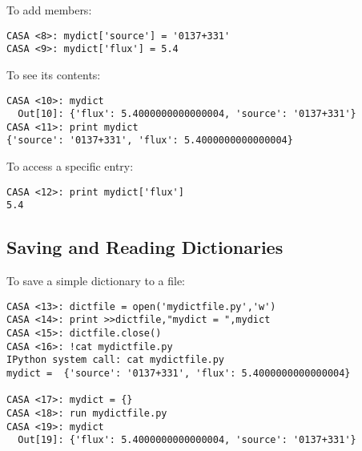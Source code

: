 To add members:
\small
\begin{verbatim}
CASA <8>: mydict['source'] = '0137+331'
CASA <9>: mydict['flux'] = 5.4
\end{verbatim}
\normalsize

To see its contents:
\small
\begin{verbatim}
CASA <10>: mydict
  Out[10]: {'flux': 5.4000000000000004, 'source': '0137+331'}
CASA <11>: print mydict 
{'source': '0137+331', 'flux': 5.4000000000000004}
\end{verbatim}
\normalsize

To access a specific entry:
\small
\begin{verbatim}
CASA <12>: print mydict['flux']
5.4
\end{verbatim}
\normalsize

\subsection{Saving and Reading Dictionaries}
\label{section:python.dict.save}

To save a simple dictionary to a file:
\small
\begin{verbatim}
CASA <13>: dictfile = open('mydictfile.py','w')
CASA <14>: print >>dictfile,"mydict = ",mydict
CASA <15>: dictfile.close()
CASA <16>: !cat mydictfile.py
IPython system call: cat mydictfile.py
mydict =  {'source': '0137+331', 'flux': 5.4000000000000004}

CASA <17>: mydict = {}
CASA <18>: run mydictfile.py
CASA <19>: mydict
  Out[19]: {'flux': 5.4000000000000004, 'source': '0137+331'}
\end{verbatim}
\normalsize


